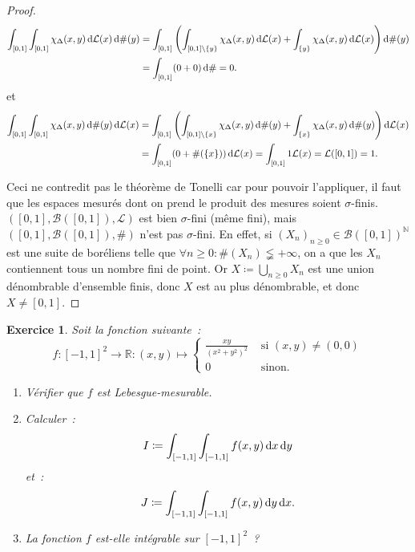 \documentclass{article}
\newtheorem{ex}{Exercice}[section]
\newcommand{\pinfty}{{+\infty}}
\newcommand{\N}{{\mathbb N}}
\newcommand{\R}{{\mathbb R}}
\begin{document}
\begin{proof}
\begin{align*}
	\int_{[0, 1]}\int_{[0, 1]}\chi_\Delta(x, y)\dif\mathcal L(x)\dif\#(y)
		&= \int_{[0, 1]}\left(\int_{[0, 1] \setminus \{y\}}\chi_\Delta(x,y)\dif\mathcal L(x) + \int_{\{y\}}\chi_\Delta(x, y)\dif\mathcal L(x)\right)\dif\#(y) \\
		&= \int_{[0, 1]}(0 + 0)\dif\# = 0.
\end{align*}
et
\begin{align*}
	\int_{[0, 1]}\int_{[0, 1]}\chi_\Delta(x,y)\dif\#(y)\dif\mathcal L(x)
		&= \int_{[0, 1]}\left(\int_{[0, 1] \setminus \{x\}}\chi_\Delta(x, y)\dif\#(y) + \int_{\{x\}}\chi_\Delta(x,y)\dif\#(y)\right)\dif\mathcal L(x) \\
		&= \int_{[0, 1]}(0 + \#(\{x\}))\dif\mathcal L(x) = \int_{[0, 1]}1\mathcal L(x) = \mathcal L([0, 1]) = 1.
\end{align*}

Ceci ne contredit pas le théorème de Tonelli car pour pouvoir l'appliquer, il faut que les espaces mesurés dont on prend le produit des mesures soient $\sigma$-finis.
$([0, 1], \mathcal B([0, 1]), \mathcal L)$ est bien $\sigma$-fini (même fini), mais $([0, 1], \mathcal B([0, 1]), \#)$ n'est pas $\sigma$-fini.
En effet, si $(X_n)_{n \geq 0} \in \mathcal B([0, 1])^\N$ est une suite de boréliens telle que $\forall n \geq 0 : \#(X_n) \lneqq \pinfty$, on a que les $X_n$ contiennent
tous un nombre fini de point. Or $X \coloneqq \bigcup_{n \geq 0}X_n$ est une union dénombrable d'ensemble finis, donc $X$ est au plus dénombrable, et donc $X \neq [0, 1]$.
\end{proof}

\begin{ex} Soit la fonction suivante~:
\[f : [-1, 1]^2 \to \R : (x, y) \mapsto \begin{cases}\frac {xy}{(x^2+y^2)^2} &\text{ si } (x, y) \neq (0, 0) \\0 &\text{ sinon.}\end{cases}\]
\begin{enumerate}
	\item Vérifier que $f$ est Lebesgue-mesurable.
	\item Calculer~:
	\[I \coloneqq \int_{[-1, 1]}\int_{[-1, 1]}f(x, y)\dif x\dif y\]
	et~:
	\[J \coloneqq \int_{[-1, 1]}\int_{[-1, 1]}f(x, y)\dif y\dif x.\]
	\item La fonction $f$ est-elle intégrable sur $[-1, 1]^2$~?
\end{enumerate}
\end{ex}
\end{document}
